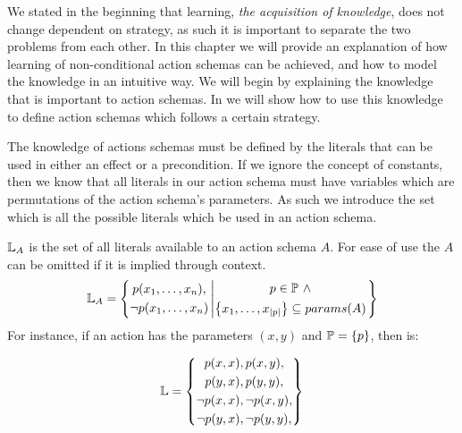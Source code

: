 \documentclass[Master.tex]{subfiles}
\begin{document}
We stated in the beginning that learning, \emph{the acquisition of knowledge}, does not change dependent on strategy, as such it is important to separate the two problems from each other.
In this chapter we will provide an explanation of how learning of non-conditional action schemas can be achieved, and how to model the knowledge in an intuitive way.
We will begin by explaining the knowledge that is important to action schemas. 
In  we will show how to use this knowledge to define action schemas which follows a certain strategy.

The knowledge of actions schemas must be defined by the literals that can be used in either an effect or a precondition.
If we ignore the concept of constants, then we know that all literals in our action schema must have variables which are permutations of the  action schema's parameters.
As such we introduce the set \lits which is all the possible literals which be used in an action schema.

\begin{definition} 
	$\mathbb{L}_A$ is the set of all literals available to an action schema $A$. For ease of use the $A$ can be omitted if it is implied through context.
	\begin{equation*}
	\mathbb{L}_A = \left\{ 
	\begin{gathered}
	p(x_1,\dots,x_n), \\
	\neg p(x_1,\dots,x_n)
	\end{gathered}
	\left|
	\begin{gathered} p \in \mathbb{P}~\land \\
	\left\{ x_1,\dots,x_{|p|} \right\} \subseteq params(A)
	\end{gathered}				
	\right.\right\}
	\end{equation*}
	For instance, if an action has the parameters $(x,y)$ and $\mathbb{P} = \{ p \}$, then \lits is:
	
	\begin{equation*}
		\mathbb{L} = \left\{
		\begin{gathered}
			p(x,x), 
			p(x,y), \\
			p(y,x), 
			p(y,y), \\
	\neg	p(x,x), 
	\neg	p(x,y), \\
	\neg	p(y,x), 
	\neg	p(y,y),
		\end{gathered}
		\right\}
	\end{equation*}
	
\end{definition}
\end{document}
